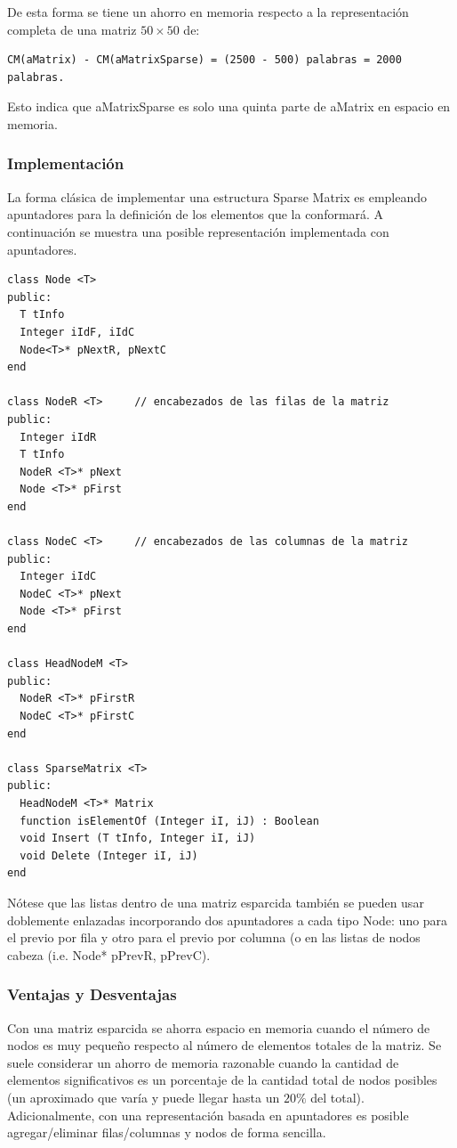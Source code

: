 De esta forma se tiene un ahorro en memoria respecto a la representación completa de una matriz $50 \times 50$ de: 
\begin{lstlisting}[upquote=true, language=pseudo]
CM(aMatrix) - CM(aMatrixSparse) = (2500 - 500) palabras = 2000 palabras. 
\end{lstlisting}

Esto indica que aMatrixSparse es solo una quinta parte de aMatrix en espacio en memoria.

\subsubsection{Implementación}

La forma clásica de implementar una estructura Sparse Matrix es empleando apuntadores para la definición de los elementos que la conformará. A continuación se muestra una posible representación implementada con apuntadores.

\begin{lstlisting}[upquote=true, language=pseudo]
class Node <T>
public:
  T tInfo
  Integer iIdF, iIdC
  Node<T>* pNextR, pNextC
end

class NodeR <T>		// encabezados de las filas de la matriz
public:
  Integer iIdR
  T	tInfo
  NodeR <T>* pNext
  Node <T>* pFirst
end

class NodeC <T>		// encabezados de las columnas de la matriz
public:
  Integer iIdC
  NodeC <T>* pNext
  Node <T>* pFirst
end

class HeadNodeM <T>
public:
  NodeR <T>* pFirstR
  NodeC <T>* pFirstC
end

class SparseMatrix <T>
public:
  HeadNodeM <T>* Matrix
  function isElementOf (Integer iI, iJ) : Boolean
  void Insert (T tInfo, Integer iI, iJ)
  void Delete (Integer iI, iJ)
end
\end{lstlisting}

Nótese que las listas dentro de una matriz esparcida también se pueden usar doblemente enlazadas incorporando dos apuntadores a cada tipo Node: uno para el previo por fila y otro para el previo por columna (o en las listas de nodos cabeza (i.e. Node* pPrevR, pPrevC).


\subsubsection{Ventajas y Desventajas}

Con una matriz esparcida se ahorra espacio en memoria cuando el número de nodos es muy pequeño respecto al número de elementos totales de la matriz. Se suele considerar un ahorro de memoria razonable cuando la cantidad de elementos significativos es un porcentaje de la cantidad total de nodos posibles (un aproximado que varía y puede llegar hasta un $20\%$ del total). Adicionalmente, con una representación basada en apuntadores es posible agregar/eliminar filas/columnas y nodos de forma sencilla.

